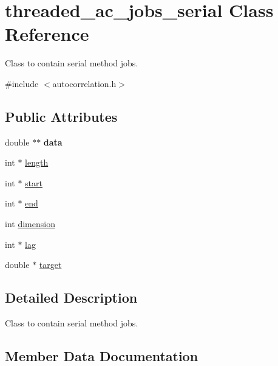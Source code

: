 \hypertarget{classthreaded__ac__jobs__serial}{}\section{threaded\+\_\+ac\+\_\+jobs\+\_\+serial Class Reference}
\label{classthreaded__ac__jobs__serial}


Class to contain serial method jobs.  




{\ttfamily \#include $<$autocorrelation.\+h$>$}

\subsection*{Public Attributes}
\begin{DoxyCompactItemize}
\item 
\mbox{\label{classthreaded__ac__jobs__serial_acfc487b367aa6bd91dfd51a5994b89ee}} 
double $\ast$$\ast$ {\bfseries data}
\item 
int $\ast$ \hyperlink{classthreaded__ac__jobs__serial_ae6153a4df9771175723ec04d7eec03b4}{length}
\item 
int $\ast$ \hyperlink{classthreaded__ac__jobs__serial_a358a286626c91db48b779ee0a1be7201}{start}
\item 
int $\ast$ \hyperlink{classthreaded__ac__jobs__serial_afcb4978468003aae945aa2a63681b86e}{end}
\item 
int \hyperlink{classthreaded__ac__jobs__serial_a5ecfde8b822ea61788c90739a1a3929c}{dimension}
\item 
int $\ast$ \hyperlink{classthreaded__ac__jobs__serial_a6a149a8f7f02ed82c6ade734208acc0a}{lag}
\item 
double $\ast$ \hyperlink{classthreaded__ac__jobs__serial_a0a870c7ac95ad680d3bc8ca80f1df9f3}{target}
\end{DoxyCompactItemize}


\subsection{Detailed Description}
Class to contain serial method jobs. 

\subsection{Member Data Documentation}
\mbox{\label{classthreaded__ac__jobs__serial_a5ecfde8b822ea61788c90739a1a3929c}} 
